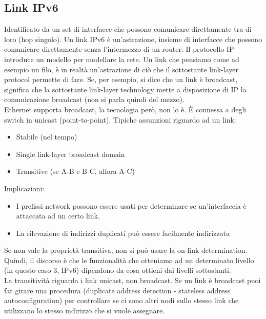 \documentclass{article}
\begin{document}
\subsection{Link IPv6}
Identificato da un set di interfacce che possono comunicare direttamente tra di loro (hop singolo). Un link IPv6 è un’astrazione, insieme di interfacce che possono comunicare direttamente senza l’intermezzo di un router. 
Il protocollo IP introduce un modello per modellare la rete. Un link che pensiamo come ad esempio un filo, è in realtà un'astrazione di ciò che il sottostante link-layer protocol permette di fare. Se, per esempio, si dice che un link è broadcast, significa che la sottostante link-layer technology mette a disposizione di IP la comunicazione broadcast (non si parla quindi del mezzo). \\
Ethernet supporta broadcast, la tecnologia però, non lo è. È connessa a degli switch in unicast (point-to-point).
Tipiche assunzioni riguardo ad un link:
\begin{itemize}
    \item Stabile (nel tempo)
    \item Single link-layer broadcast domain
    \item Transitive (se A-B e B-C, allora A-C)
\end{itemize}{}
Implicazioni:
\begin{itemize}
    \item I prefissi network possono essere usati per determinare se un'interfaccia è attaccata ad un certo link.
    \item La rilevazione di indirizzi duplicati può essere facilmente indirizzata
\end{itemize}{}
Se non vale la proprietà transitiva, non si può usare la on-link determination. Quindi, il discorso è che le funzionalità che otteniamo ad un determinato livello (in questo caso 3, IPv6) dipendono da cosa ottieni dai livelli sottostanti.\\
La transitività riguarda i link unicast, non broadcast. Se un link è broadcast puoi far girare una procedura (duplicate address detection - stateless address autoconfiguration) per controllare se ci sono altri nodi sullo stesso link che utilizzano lo stesso indirizzo che si vuole assegnare.
\end{document}

